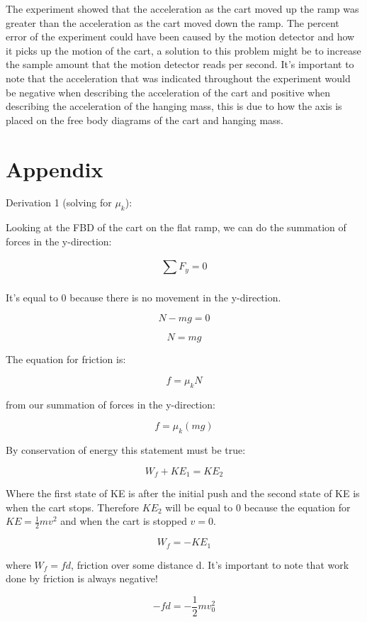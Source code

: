 \documentclass[aps,letterpaper,11pt]{revtex4}
\begin{document}
The experiment showed that the acceleration as the cart moved up the ramp was greater than the acceleration as the cart moved down the ramp. The percent error of the experiment could have been caused by the motion detector and how it picks up the motion of the cart, a solution to this problem might be to increase the sample amount that the motion detector reads per second. It's important to note that the acceleration that was indicated throughout the experiment would be negative when describing the acceleration of the cart and positive when describing the acceleration of the hanging mass, this is due to how the axis is placed on the free body diagrams of the cart and hanging mass. 

\section{Appendix}

Derivation 1 (solving for $\mu_k$):

\begin{center}

\end{center}

Looking at the FBD of the cart on the flat ramp, we can do the summation of forces in the y-direction:

$$ \sum_{}^{}F_y = 0$$

It's equal to 0 because there is no movement in the y-direction.

$$ N - mg = 0$$

$$ N = mg$$

The equation for friction is:

$$ f = \mu_kN$$

from our summation of forces in the y-direction:

$$ f = \mu_k(mg)$$

By conservation of energy this statement must be true:

$$ W_f + KE_1 = KE_2$$

Where the first state of KE is after the initial push and the second state of KE is when the cart stops. Therefore $KE_2$ will be equal to 0 because the equation for $KE = \frac{1}{2}mv^2$ and when the cart is stopped $v = 0$. 

$$ W_f = -KE_1$$

where $W_f = fd$, friction over some distance d. It's important to note that work done by friction is always negative! 

$$ -fd = -\frac{1}{2}mv_0^2$$
\end{document}
